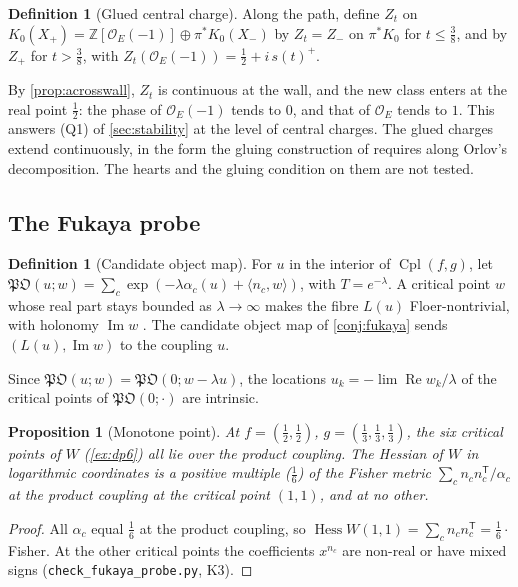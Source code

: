 \documentclass[11pt]{article}
\newtheorem{proposition}[theorem]{Proposition}
\theoremstyle{definition}
\newtheorem{definition}[theorem]{Definition}
\theoremstyle{remark}
\newcommand{\Cpl}{\operatorname{Cpl}}
\begin{document}
\begin{definition}[Glued central charge]\label{def:gluedZ}
Along the path, define $Z_t$ on $K_0(X_+)=\mathbb Z[\mathcal O_E(-1)]\oplus\pi^*K_0(X_-)$ by $Z_t=Z_-$ on $\pi^*K_0$ for
$t\le\frac38$, and by $Z_+$ for $t>\frac38$, with $Z_t(\mathcal O_E(-1))=\frac12+i\,s(t)^+$.
\end{definition}

By \cref{prop:acrosswall}, $Z_t$ is continuous at the wall, and the new class enters at the real point $\frac12$: the phase of
$\mathcal O_E(-1)$ tends to $0$, and that of $\mathcal O_E$ tends to $1$. This answers (Q1) of \cref{sec:stability} at the level
of central charges. The glued charges extend continuously, in the form the gluing construction of
\cite{CollinsPolishchuk2010} requires along Orlov's decomposition. The hearts and the gluing condition on them are not
tested.

\subsection{The Fukaya probe}\label{sec:fukprobe}

\begin{definition}[Candidate object map]\label{def:fukobj}
For $u$ in the interior of $\Cpl(f,g)$, let
$\mathfrak{PO}(u;w)=\sum_c\exp(-\lambda\alpha_c(u)+\langle n_c,w\rangle)$, with $T=e^{-\lambda}$. A critical point $w$ whose real part
stays bounded as $\lambda\to\infty$ makes the fibre $L(u)$ Floer-nontrivial, with holonomy $\operatorname{Im}w$ \cite{FOOO2010}.
The candidate object map of \cref{conj:fukaya} sends $(L(u),\operatorname{Im}w)$ to the coupling $u$.
\end{definition}

Since $\mathfrak{PO}(u;w)=\mathfrak{PO}(0;w-\lambda u)$, the locations $u_k=-\lim\operatorname{Re}w_k/\lambda$ of the critical points of
$\mathfrak{PO}(0;\cdot)$ are intrinsic.

\begin{proposition}[Monotone point]\label{prop:fukmono}
At $f=(\frac12,\frac12)$, $g=(\frac13,\frac13,\frac13)$, the six critical points of $W$ (\cref{ex:dp6}) all lie over the product
coupling. The Hessian of $W$ in logarithmic coordinates is a positive multiple ($\frac16$) of the Fisher metric
$\sum_cn_cn_c^{\mathsf T}/\alpha_c$ at the product coupling at the critical point $(1,1)$, and at no other.
\end{proposition}
\begin{proof}
All $\alpha_c$ equal $\frac16$ at the product coupling, so $\operatorname{Hess}W(1,1)=\sum_cn_cn_c^{\mathsf T}=\frac16\cdot$Fisher. At the other
critical points the coefficients $x^{n_c}$ are non-real or have mixed signs (\texttt{check\_fukaya\_probe.py}, K3).
\end{proof}
\end{document}
